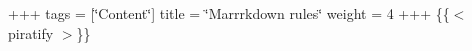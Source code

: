 +++ tags = \mbox{[}\char`\"{}\+Content\char`\"{}\mbox{]} title = \char`\"{}\+Marrrkdown rules\char`\"{} weight = 4 +++ \{\{$<$ piratify $>$\}\} 